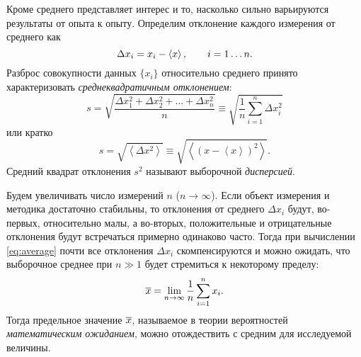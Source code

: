 

Кроме среднего представляет интерес и то, насколько сильно варьируются
результаты от опыта к опыту. Определим отклонение каждого измерения от среднего как
\[
\Delta x_{i}=x_{i}-\left<x\right>,\qquad i=1\ldots n.
\]
Разброс совокупности данных $\{x_i\}$ относительно среднего принято характеризовать
\emph{среднеквадратичным отклонением}:
\begin{equation}
s = \sqrt{\frac{\Delta x_{1}^{2}+\Delta x_{2}^{2}+\ldots+\Delta
x_{n}^{2}}{n}}\equiv \sqrt{\frac{1}{n}\sum\limits _{i=1}^{n}\Delta
x_{i}^{2}}\label{eq:sigma}
\end{equation}
или кратко
\begin{equation}
s = \sqrt{\left<\Delta x^{2}\right>} \equiv \sqrt{\left<(x-\left<x\right>)^{2}\right>}.\label{eq:sigma_s}
\end{equation}
Средний квадрат отклонения $s^{2}$ называют выборочной \emph{дисперсией}.

%

Будем увеличивать число измерений $n$ ($n\to \infty$). Если объект измерения и методика
достаточно стабильны, то отклонения от среднего $\Delta x_i$ будут, во-первых,
относительно малы, а во-вторых, положительные и отрицательные отклонения будут
встречаться примерно одинаково часто. Тогда при вычислении \eqref{eq:average}
почти все отклонения $\Delta x_i$ скомпенсируются и можно ожидать,
что выборочное среднее при $n\gg 1$ будет стремиться к некоторому пределу:
\[
\overline{x} = \lim_{n\to\infty}\frac{1}{n}\sum_{i=1}^{n}x_{i}.
\]
Тогда предельное значение $\overline{x}$, называемое в теории вероятностей \emph{математическим ожиданием}, 
можно отождествить с  средним для исследуемой величины.

